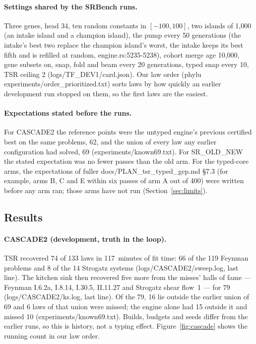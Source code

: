 \documentclass[sigconf,nonacm]{acmart}
\newcommand{\src}[1]{{\small\ttfamily #1}}
\begin{document}
\paragraph{Settings shared by the SRBench runs.} Three genes, head 34, ten
random constants in $[-100,100]$, two islands of 1{,}000 (an intake island and
a champion island), the pump every 50 generations (the intake's best two
replace the champion island's worst, the intake keeps its best fifth and is
refilled at random, \src{engine.\allowbreak{}rs:5235-5238}), cohort merge age 10{,}000,
gene subsets on, snap, fold and beam every 20 generations, typed snap every 10,
TSR ceiling 2 (\src{logs/\allowbreak{}TF\_\allowbreak{}DEV1/\allowbreak{}card.\allowbreak{}json}). Our law order
(\src{phylu experiments/\allowbreak{}order\_\allowbreak{}prioritized.\allowbreak{}txt}) sorts laws by how quickly an
earlier development run stopped on them, so the first laws are the easiest.

\paragraph{Expectations stated before the runs.} For CASCADE2 the reference
points were the untyped engine's previous certified best on the same problems,
62, and the union of every law any earlier configuration had solved, 69
(\src{experiments/\allowbreak{}known69.\allowbreak{}txt}). For SR\_OLD\_NEW the stated expectation was no
fewer passes than the old arm. For the typed-core arms, the expectations of
\src{fuller docs/\allowbreak{}PLAN\_\allowbreak{}tsr\_\allowbreak{}typed\_\allowbreak{}gep.\allowbreak{}md} \S7.3 (for example, arms B, C and E
within six passes of arm A out of 400) were written before any arm ran; those
arms have not run (Section~\ref{sec:limits}).

\subsection{Results}

\paragraph{CASCADE2 (development, truth in the loop).} TSR recovered 74 of 133
laws in 117~minutes of fit time: 66 of the 119 Feynman problems and 8 of the 14
Strogatz systems (\src{logs/\allowbreak{}CASCADE2/\allowbreak{}sweep.\allowbreak{}log}, last line). The kitchen sink
then recovered five more from the misses' halls of fame --- Feynman I.6.2a,
I.8.14, I.30.5, II.11.27 and Strogatz shear flow~1 --- for 79
(\src{logs/\allowbreak{}CASCADE2/\allowbreak{}ks.\allowbreak{}log}, last line). Of the 79, 16 lie outside the
earlier union of 69 and 6 laws of that union were missed; the engine alone had
15 outside it and missed 10 (\src{experiments/\allowbreak{}known69.\allowbreak{}txt}). Builds, budgets and seeds differ from the
earlier runs, so this is history, not a typing effect.
Figure~\ref{fig:cascade} shows the running count in our law order.
\end{document}
